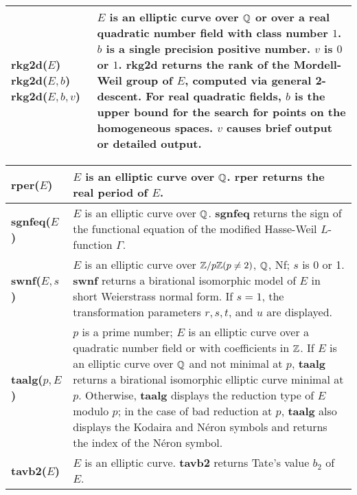 {\begin{tabular}{|p{1.95in}|p{3.83in}|}
{\bf rkg2d($E$)}\newline
{\bf rkg2d($E,b$)}\newline
{\bf rkg2d($E, b, v$)} &
$E$ is an elliptic curve over $\mbox{$\mathbb Q$}$ or over a real quadratic 
number field with class number $1$. $b$ is 
a single precision positive number. $v$ is $0$ or $1$.\newline
{\bf rkg2d} returns the rank of the Mordell-Weil group of $E$, computed
via general 2-descent. For real quadratic
fields, $b$ is the upper bound for the search for points on the
homogeneous spaces. $v$ causes brief output or detailed output. \\ \hline
\end{tabular}

\newpage

\begin{tabular}{|p{1.95in}|p{3.83in}|} \hline

{\bf rper($E$)} &
$E$ is an elliptic curve over $\mbox{$\mathbb Q$}$.\newline
{\bf rper} returns the real period of $E$.\\ \hline

{\bf sgnfeq($E$)} &
$E$ is an elliptic curve over $\mbox{$\mathbb Q$}$.\newline
{\bf sgnfeq} returns the sign of the functional equation
of the modified Hasse-Weil $L$-function $\Gamma$.\\ \hline

{\bf swnf($E,s$)} &
$E$ is an elliptic curve over $\mbox{$\mathbb Z$}/p\mbox{$\mathbb Z$} (p\not=2)$, $\mbox{$\mathbb Q$}$, Nf; $s$ is 0 or 1.\newline
{\bf swnf} returns a birational isomorphic model of $E$ in short Weierstrass
normal form. If $s=1$, the transformation parameters $r,s,t$, and $u$ are
displayed.\\ \hline

{\bf taalg($p,E$)} &
$p$ is a prime number; $E$ is an elliptic curve over a quadratic number field
or with coefficients in $\mbox{$\mathbb Z$}$.\newline
If $E$ is an elliptic curve over $\mbox{$\mathbb Q$}$ and not minimal at $p$, {\bf taalg}
returns a birational isomorphic elliptic curve minimal at $p$.
Otherwise, {\bf taalg} displays the reduction type of $E$ modulo $p$;
in the case of bad reduction at $p$, {\bf taalg} also displays the
Kodaira and N\'eron symbols and returns the index of the N\'eron symbol.\\ \hline

{\bf tavb2($E$)} &
$E$ is an elliptic curve.\newline
{\bf tavb2} returns Tate's value $b_2$ of $E$.\\ \hline


\end{tabular}}
